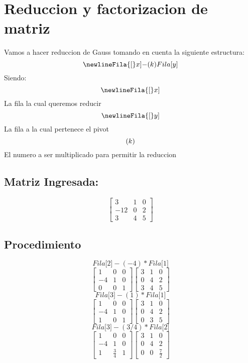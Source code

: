 \documentclass{article}%
\begin{document}
%
\normalsize%
\[%
%
\]%
\section{Reduccion y factorizacion de matriz}%
\label{sec:Reduccionyfactorizaciondematriz}%
Vamos a hacer reduccion de Gauss tomando en cuenta la siguiente estructura:%
\[%
\newline%
Fila{[}x{]}{-}(k)Fila{[}y{]}%
\]%
Siendo:%
\[%
\newline%
Fila{[}x{]}%
\]%
La fila la cual queremos reducir%
\[%
\newline%
Fila{[}y{]}%
\]%
La fila a la cual pertenece el pivot\newline%
%
\[%
\newline%
(k)%
\]%
El numero a ser multiplicado para permitir la reduccion\newline%
%
\subsection{Matriz Ingresada: }%
\label{subsec:MatrizIngresada}%
\[%
\left[\begin{matrix}3 & 1 & 0\\-12 & 0 & 2\\3 & 4 & 5\end{matrix}\right]%
\]

%
\subsection{Procedimiento}%
\label{subsec:Procedimiento}%
\[%
Fila{[}2{]}{-}({-}4)*Fila{[}1{]}%
\]%
\[%
\left[\begin{matrix}1 & 0 & 0\\-4 & 1 & 0\\0 & 0 & 1\end{matrix}\right] \left[\begin{matrix}3 & 1 & 0\\0 & 4 & 2\\3 & 4 & 5\end{matrix}\right]%
\]%
\[%
Fila{[}3{]}{-}(1)*Fila{[}1{]}%
\]%
\[%
\left[\begin{matrix}1 & 0 & 0\\-4 & 1 & 0\\1 & 0 & 1\end{matrix}\right] \left[\begin{matrix}3 & 1 & 0\\0 & 4 & 2\\0 & 3 & 5\end{matrix}\right]%
\]%
\[%
Fila{[}3{]}{-}(3/4)*Fila{[}2{]}%
\]%
\[%
\left[\begin{matrix}1 & 0 & 0\\-4 & 1 & 0\\1 & \frac{3}{4} & 1\end{matrix}\right] \left[\begin{matrix}3 & 1 & 0\\0 & 4 & 2\\0 & 0 & \frac{7}{2}\end{matrix}\right]%
\]
\end{document}
